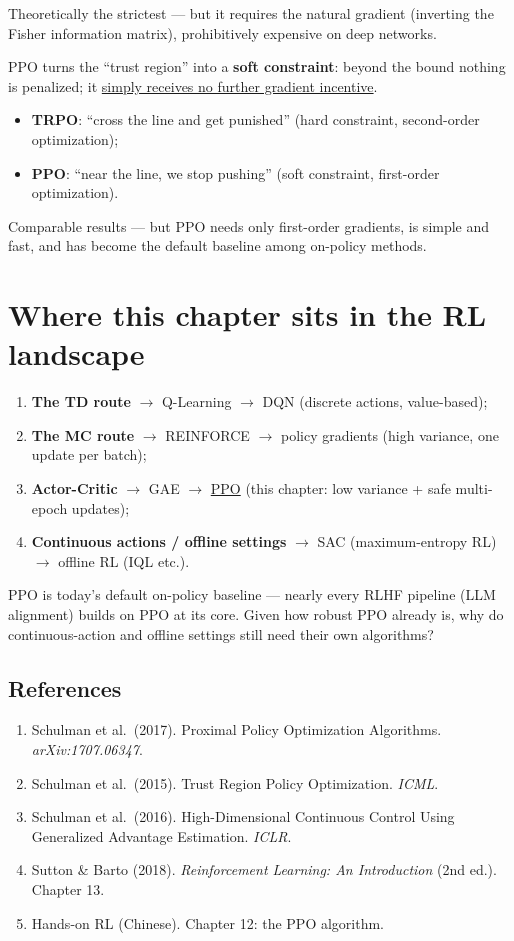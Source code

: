 \documentclass{article}
\begin{document}
Theoretically the strictest --- but it requires the natural gradient (inverting the Fisher information matrix), prohibitively expensive on deep networks.

PPO turns the ``trust region'' into a \textbf{soft constraint}: beyond the bound nothing is penalized; it \underline{simply receives no further gradient incentive}.

\begin{itemize}
  \item \textbf{TRPO}: ``cross the line and get punished'' (hard constraint, second-order optimization);
  \item \textbf{PPO}: ``near the line, we stop pushing'' (soft constraint, first-order optimization).
\end{itemize}

Comparable results --- but PPO needs only first-order gradients, is simple and fast, and has become the default baseline among on-policy methods.

\section*{Where this chapter sits in the RL landscape}

\begin{enumerate}
  \item \textbf{The TD route} $\to$ Q-Learning $\to$ DQN (discrete actions, value-based);
  \item \textbf{The MC route} $\to$ REINFORCE $\to$ policy gradients (high variance, one update per batch);
  \item \textbf{Actor-Critic} $\to$ GAE $\to$ \underline{PPO} (this chapter: low variance + safe multi-epoch updates);
  \item \textbf{Continuous actions / offline settings} $\to$ SAC (maximum-entropy RL) $\to$ offline RL (IQL etc.).
\end{enumerate}

PPO is today's default on-policy baseline --- nearly every RLHF pipeline (LLM alignment) builds on PPO at its core. Given how robust PPO already is, why do continuous-action and offline settings still need their own algorithms?

\subsection*{References}

\begin{enumerate}
  \item Schulman et al.\ (2017). Proximal Policy Optimization Algorithms. \textit{arXiv:1707.06347}.
  \item Schulman et al.\ (2015). Trust Region Policy Optimization. \textit{ICML}.
  \item Schulman et al.\ (2016). High-Dimensional Continuous Control Using Generalized Advantage Estimation. \textit{ICLR}.
  \item Sutton \& Barto (2018). \textit{Reinforcement Learning: An Introduction} (2nd ed.). Chapter 13.
  \item Hands-on RL (Chinese). Chapter 12: the PPO algorithm.
\end{enumerate}
\end{document}
